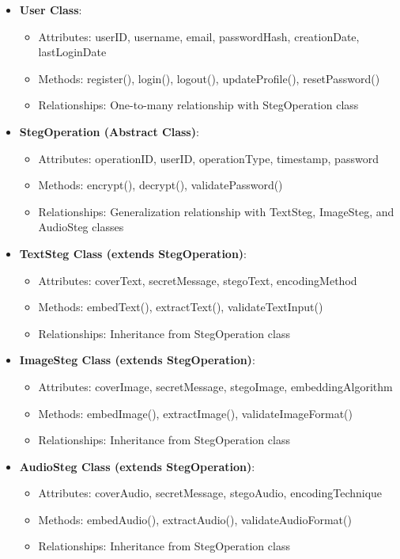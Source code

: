 \documentclass[12pt, a4paper, oneside]{book}
\begin{document}
\begin{itemize}[leftmargin=*]
    \item \textbf{User Class}:
    \begin{itemize}
        \item Attributes: userID, username, email, passwordHash, creationDate, lastLoginDate
        \item Methods: register(), login(), logout(), updateProfile(), resetPassword()
        \item Relationships: One-to-many relationship with StegOperation class
    \end{itemize}

    \item \textbf{StegOperation (Abstract Class)}:
    \begin{itemize}
        \item Attributes: operationID, userID, operationType, timestamp, password
        \item Methods: encrypt(), decrypt(), validatePassword()
        \item Relationships: Generalization relationship with TextSteg, ImageSteg, and AudioSteg classes
    \end{itemize}

    \item \textbf{TextSteg Class (extends StegOperation)}:
    \begin{itemize}
        \item Attributes: coverText, secretMessage, stegoText, encodingMethod
        \item Methods: embedText(), extractText(), validateTextInput()
        \item Relationships: Inheritance from StegOperation class
    \end{itemize}

    \item \textbf{ImageSteg Class (extends StegOperation)}:
    \begin{itemize}
        \item Attributes: coverImage, secretMessage, stegoImage, embeddingAlgorithm
        \item Methods: embedImage(), extractImage(), validateImageFormat()
        \item Relationships: Inheritance from StegOperation class
    \end{itemize}

    \item \textbf{AudioSteg Class (extends StegOperation)}:
    \begin{itemize}
        \item Attributes: coverAudio, secretMessage, stegoAudio, encodingTechnique
        \item Methods: embedAudio(), extractAudio(), validateAudioFormat()
        \item Relationships: Inheritance from StegOperation class
    \end{itemize}


\end{itemize}
\end{document}
